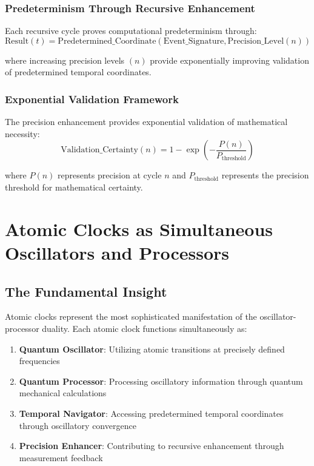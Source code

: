 \documentclass[12pt,a4paper]{article}
\begin{document}
\subsubsection{Predeterminism Through Recursive Enhancement}

Each recursive cycle proves computational predeterminism through:
\begin{equation}
\text{Result}(t) = \text{Predetermined\_Coordinate}(\text{Event\_Signature}, \text{Precision\_Level}(n))
\end{equation}

where increasing precision levels $(n)$ provide exponentially improving validation of predetermined temporal coordinates.

\subsubsection{Exponential Validation Framework}

The precision enhancement provides exponential validation of mathematical necessity:
\begin{equation}
\text{Validation\_Certainty}(n) = 1 - \exp\left(-\frac{P(n)}{P_{\text{threshold}}}\right)
\end{equation}

where $P(n)$ represents precision at cycle $n$ and $P_{\text{threshold}}$ represents the precision threshold for mathematical certainty.

\section{Atomic Clocks as Simultaneous Oscillators and Processors}

\subsection{The Fundamental Insight}

Atomic clocks represent the most sophisticated manifestation of the oscillator-processor duality. Each atomic clock functions simultaneously as:

\begin{enumerate}
\item \textbf{Quantum Oscillator}: Utilizing atomic transitions at precisely defined frequencies
\item \textbf{Quantum Processor}: Processing oscillatory information through quantum mechanical calculations
\item \textbf{Temporal Navigator}: Accessing predetermined temporal coordinates through oscillatory convergence
\item \textbf{Precision Enhancer}: Contributing to recursive enhancement through measurement feedback
\end{enumerate}
\end{document}
